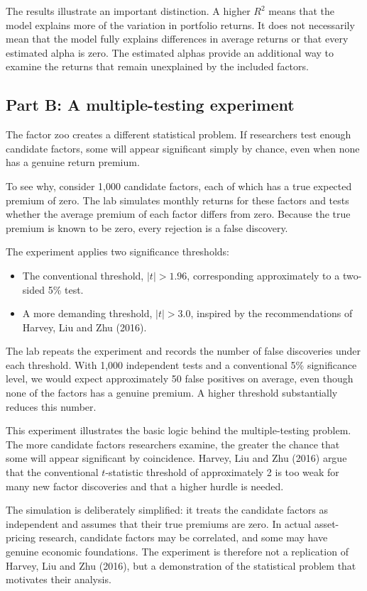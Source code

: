 The results illustrate an important distinction. A higher $R^2$ means that the model explains more of the variation in portfolio returns. It does not necessarily mean that the model fully explains differences in average returns or that every estimated alpha is zero. The estimated alphas provide an additional way to examine the returns that remain unexplained by the included factors.

\subsection*{Part B: A multiple-testing experiment}

The factor zoo creates a different statistical problem. If researchers test enough candidate factors, some will appear significant simply by chance, even when none has a genuine return premium.

To see why, consider 1,000 candidate factors, each of which has a true expected premium of zero. The lab simulates monthly returns for these factors and tests whether the average premium of each factor differs from zero. Because the true premium is known to be zero, every rejection is a false discovery.

The experiment applies two significance thresholds:
\begin{itemize}
  \item The conventional threshold, $|t|>1.96$, corresponding approximately to a two-sided 5\% test.
  \item A more demanding threshold, $|t|>3.0$, inspired by the recommendations of Harvey, Liu and Zhu (2016).
\end{itemize}

The lab repeats the experiment and records the number of false discoveries under each threshold. With 1,000 independent tests and a conventional 5\% significance level, we would expect approximately 50 false positives on average, even though none of the factors has a genuine premium. A higher threshold substantially reduces this number.

This experiment illustrates the basic logic behind the multiple-testing problem. The more candidate factors researchers examine, the greater the chance that some will appear significant by coincidence. Harvey, Liu and Zhu (2016) argue that the conventional $t$-statistic threshold of approximately 2 is too weak for many new factor discoveries and that a higher hurdle is needed.

The simulation is deliberately simplified: it treats the candidate factors as independent and assumes that their true premiums are zero. In actual asset-pricing research, candidate factors may be correlated, and some may have genuine economic foundations. The experiment is therefore not a replication of Harvey, Liu and Zhu (2016), but a demonstration of the statistical problem that motivates their analysis.

